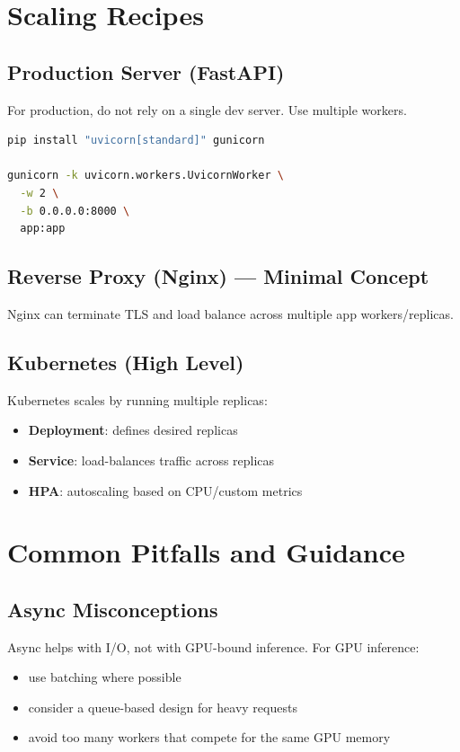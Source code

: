 \documentclass[11pt]{article}
\begin{document}
\section{Scaling Recipes}

\subsection{Production Server (FastAPI)}
For production, do not rely on a single dev server. Use multiple workers.
\begin{lstlisting}[language=bash]
pip install "uvicorn[standard]" gunicorn

gunicorn -k uvicorn.workers.UvicornWorker \
  -w 2 \
  -b 0.0.0.0:8000 \
  app:app
\end{lstlisting}

\subsection{Reverse Proxy (Nginx) --- Minimal Concept}
Nginx can terminate TLS and load balance across multiple app workers/replicas.

\subsection{Kubernetes (High Level)}
Kubernetes scales by running multiple replicas:
\begin{itemize}
  \item \textbf{Deployment}: defines desired replicas
  \item \textbf{Service}: load-balances traffic across replicas
  \item \textbf{HPA}: autoscaling based on CPU/custom metrics
\end{itemize}

\section{Common Pitfalls and Guidance}

\subsection{Async Misconceptions}
Async helps with I/O, not with GPU-bound inference. For GPU inference:
\begin{itemize}
  \item use batching where possible
  \item consider a queue-based design for heavy requests
  \item avoid too many workers that compete for the same GPU memory
\end{itemize}
\end{document}
